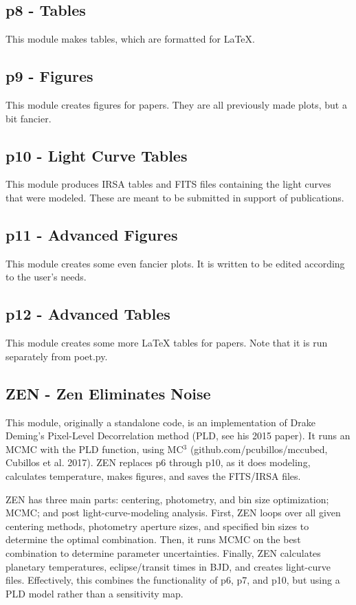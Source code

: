 \documentclass[letterpaper,12pt]{article}
\begin{document}
\subsection{p8 - Tables}
\label{sec:p8}
This module makes tables, which are formatted for LaTeX.

\subsection{p9 - Figures}
\label{sec:p9}
This module creates figures for papers. They are all previously made
plots, but a bit fancier.

\subsection{p10 - Light Curve Tables}
\label{sec:p10}
This module produces IRSA tables and FITS files containing the light
curves that were modeled. These are meant to be submitted in support
of publications.

\subsection{p11 - Advanced Figures}
\label{sec:p11}
This module creates some even fancier plots. It is written to be edited
according to the user's needs.

\subsection{p12 - Advanced Tables}
\label{sec:p12}
This module creates some more LaTeX tables for papers. Note that it is
run separately from poet.py.

\subsection{ZEN - Zen Eliminates Noise}
\label{sec:zen}
This module, originally a standalone code, is an implementation of
Drake Deming's Pixel-Level Decorrelation method (PLD, see his 2015
paper).  It runs an MCMC with the PLD function, using MC$^3$
(github.com/pcubillos/mccubed, Cubillos et al. 2017). ZEN replaces p6
through p10, as it does modeling, calculates temperature, makes
figures, and saves the FITS/IRSA files.

ZEN has three main parts: centering, photometry, and bin size
optimization; MCMC; and post light-curve-modeling analysis. First, ZEN
loops over all given centering methods, photometry aperture sizes, and
specified bin sizes to determine the optimal combination. Then, it
runs MCMC on the best combination to determine parameter
uncertainties. Finally, ZEN calculates planetary temperatures,
eclipse/transit times in BJD, and creates light-curve
files. Effectively, this combines the functionality of p6, p7, and
p10, but using a PLD model rather than a sensitivity map.
\end{document}
